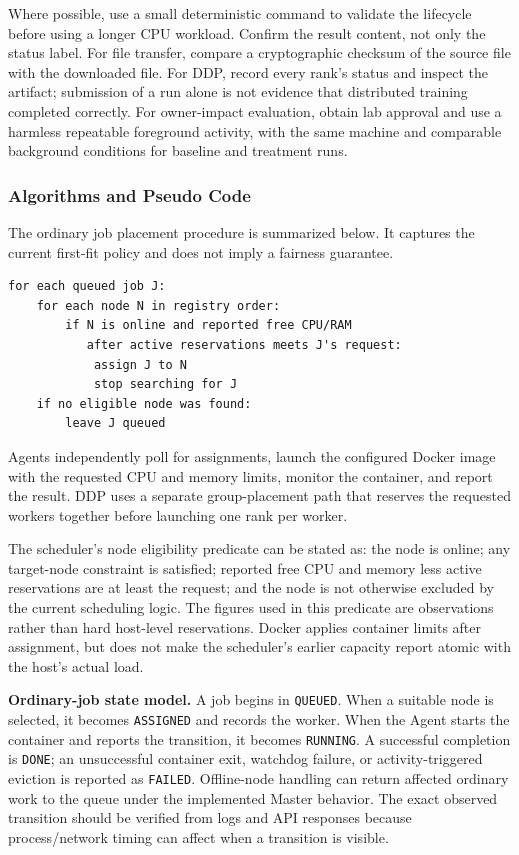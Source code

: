 \documentclass{article}
\begin{document}
Where possible, use a small deterministic command to validate the lifecycle before using a longer CPU workload. Confirm the result content, not only the status label. For file transfer, compare a cryptographic checksum of the source file with the downloaded file. For DDP, record every rank's status and inspect the artifact; submission of a run alone is not evidence that distributed training completed correctly. For owner-impact evaluation, obtain lab approval and use a harmless repeatable foreground activity, with the same machine and comparable background conditions for baseline and treatment runs.

	\subsubsection{Algorithms and Pseudo Code}
The ordinary job placement procedure is summarized below. It captures the current first-fit policy and does not imply a fairness guarantee.
\begin{verbatim}
for each queued job J:
    for each node N in registry order:
        if N is online and reported free CPU/RAM
           after active reservations meets J's request:
            assign J to N
            stop searching for J
    if no eligible node was found:
        leave J queued
\end{verbatim}
Agents independently poll for assignments, launch the configured Docker image with the requested CPU and memory limits, monitor the container, and report the result. DDP uses a separate group-placement path that reserves the requested workers together before launching one rank per worker.

The scheduler's node eligibility predicate can be stated as: the node is online; any target-node constraint is satisfied; reported free CPU and memory less active reservations are at least the request; and the node is not otherwise excluded by the current scheduling logic. The figures used in this predicate are observations rather than hard host-level reservations. Docker applies container limits after assignment, but does not make the scheduler's earlier capacity report atomic with the host's actual load.

\textbf{Ordinary-job state model.} A job begins in \texttt{QUEUED}. When a suitable node is selected, it becomes \texttt{ASSIGNED} and records the worker. When the Agent starts the container and reports the transition, it becomes \texttt{RUNNING}. A successful completion is \texttt{DONE}; an unsuccessful container exit, watchdog failure, or activity-triggered eviction is reported as \texttt{FAILED}. Offline-node handling can return affected ordinary work to the queue under the implemented Master behavior. The exact observed transition should be verified from logs and API responses because process/network timing can affect when a transition is visible.
\end{document}
